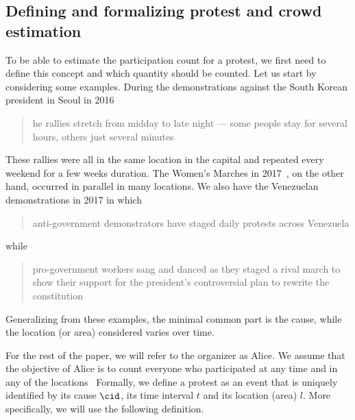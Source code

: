 \subsection{Defining and formalizing protest and crowd estimation}%
\label{protest-model}


To be able to estimate the participation count for a protest, we first need to define this concept and which quantity should be counted.
Let us start by considering some examples.
During the demonstrations against the South Korean president in Seoul in 2016
\blockcquote{2016DemonstrationsInSeoul}{%
  he rallies stretch from midday to late night --- some people stay for several hours, others just several minutes%
}.
These rallies were all in the same location in the capital and repeated every weekend for a few weeks duration.
The Women's Marches in 2017~\cite{2017WomensMarchesInUS}, on the other hand, occurred in parallel in many locations.
We also have the Venezuelan demonstrations in 2017 in which \blockcquote{2017VenezuelaProtestFrequency}{%
  anti-government demonstrators have staged daily protests across Venezuela%
} while
\blockcquote{AlJazeeraOnVenezuela2017}{%
  pro-government workers sang and danced as they staged a rival march to show their support for the president's controversial plan to rewrite the constitution%
}.
Generalizing from these examples, the minimal common part is the 
cause,\label{CauseIsTheCommonDenominator} while the location (or area) 
considered varies over time.

For the rest of the paper, we will refer to the organizer as Alice.
We assume that the objective of Alice is to count everyone who participated at any time and in any of the locations~\cite{2016DemonstrationsInSeoul} %
Formally, we define a protest as an event that is uniquely identified by its cause \(\cid\), its time interval \(t\) and its location (area) \(l\).
More specifically, we will use the following definition.

